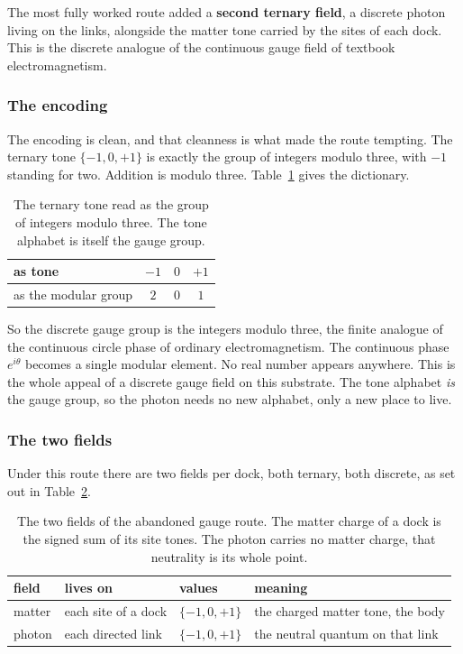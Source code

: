 The most fully worked route added a \textbf{second ternary field}, a discrete photon living on the links, alongside the matter tone carried by the sites of each dock. This is the discrete analogue of the continuous gauge field of textbook electromagnetism.

\subsubsection{The encoding}

The encoding is clean, and that cleanness is what made the route tempting. The ternary tone $\{-1, 0, +1\}$ is exactly the group of integers modulo three, with $-1$ standing for two. Addition is modulo three. Table~\ref{tab:z3-encoding} gives the dictionary.

\begin{table}[ht]
\centering
\begin{tabular}{@{}lccc@{}}
\toprule
as tone & $-1$ & $0$ & $+1$ \\
\midrule
as the modular group & $2$ & $0$ & $1$ \\
\bottomrule
\end{tabular}
\caption{The ternary tone read as the group of integers modulo three. The tone alphabet is itself the gauge group.}
\label{tab:z3-encoding}
\end{table}

So the discrete gauge group is the integers modulo three, the finite analogue of the continuous circle phase of ordinary electromagnetism. The continuous phase $e^{i\theta}$ becomes a single modular element. No real number appears anywhere. This is the whole appeal of a discrete gauge field on this substrate. The tone alphabet \emph{is} the gauge group, so the photon needs no new alphabet, only a new place to live.

\subsubsection{The two fields}

Under this route there are two fields per dock, both ternary, both discrete, as set out in Table~\ref{tab:two-fields}.

\begin{table}[ht]
\centering
\begin{tabular}{@{}llll@{}}
\toprule
field & lives on & values & meaning \\
\midrule
matter & each site of a dock & $\{-1,0,+1\}$ & the charged matter tone, the body \\
photon & each directed link & $\{-1,0,+1\}$ & the neutral quantum on that link \\
\bottomrule
\end{tabular}
\caption{The two fields of the abandoned gauge route. The matter charge of a dock is the signed sum of its site tones. The photon carries no matter charge, that neutrality is its whole point.}
\label{tab:two-fields}
\end{table}

